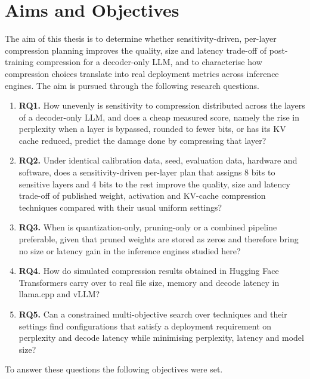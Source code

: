 \section{Aims and Objectives}
\label{sec:ch1-aims}

The aim of this thesis is to determine whether sensitivity-driven, per-layer compression planning improves the quality, size and latency trade-off of post-training compression for a decoder-only LLM, and to characterise how compression choices translate into real deployment metrics across inference engines. The aim is pursued through the following research questions.

\begin{enumerate}
  \item \textbf{RQ1.} How unevenly is sensitivity to compression distributed across the layers of a decoder-only LLM, and does a cheap measured score, namely the rise in perplexity when a layer is bypassed, rounded to fewer bits, or has its KV cache reduced, predict the damage done by compressing that layer?
  \item \textbf{RQ2.} Under identical calibration data, seed, evaluation data, hardware and software, does a sensitivity-driven per-layer plan that assigns 8 bits to sensitive layers and 4 bits to the rest improve the quality, size and latency trade-off of published weight, activation and KV-cache compression techniques compared with their usual uniform settings?
  \item \textbf{RQ3.} When is quantization-only, pruning-only or a combined pipeline preferable, given that pruned weights are stored as zeros and therefore bring no size or latency gain in the inference engines studied here?
  \item \textbf{RQ4.} How do simulated compression results obtained in Hugging Face Transformers carry over to real file size, memory and decode latency in llama.cpp and vLLM?
  \item \textbf{RQ5.} Can a constrained multi-objective search over techniques and their settings find configurations that satisfy a deployment requirement on perplexity and decode latency while minimising perplexity, latency and model size?
\end{enumerate}

To answer these questions the following objectives were set.

